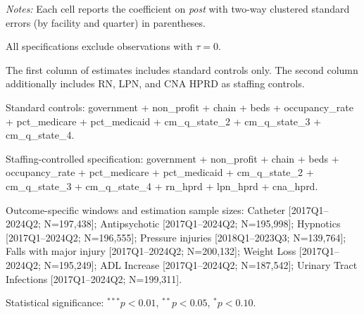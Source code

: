 \documentclass[11pt]{article}
\begin{document}
\begin{table}[!ht]
\begin{threeparttable}
\begin{tablenotes}[flushleft]
\footnotesize
\item \textit{Notes:} Each cell reports the coefficient on \textit{post} with two-way clustered standard errors (by facility and quarter) in parentheses.
\item All specifications exclude observations with $\tau = 0$.
\item The first column of estimates includes standard controls only. The second column additionally includes RN, LPN, and CNA HPRD as staffing controls.
\item Standard controls: government + non\_profit + chain + beds + occupancy\_rate + pct\_medicare + pct\_medicaid + cm\_q\_state\_2 + cm\_q\_state\_3 + cm\_q\_state\_4.
\item Staffing-controlled specification: government + non\_profit + chain + beds + occupancy\_rate + pct\_medicare + pct\_medicaid + cm\_q\_state\_2 + cm\_q\_state\_3 + cm\_q\_state\_4 + rn\_hprd + lpn\_hprd + cna\_hprd.
\item Outcome-specific windows and estimation sample sizes: Catheter [2017Q1--2024Q2; N=197,438]; Antipsychotic [2017Q1--2024Q2; N=195,998]; Hypnotics [2017Q1--2024Q2; N=196,555]; Pressure injuries [2018Q1--2023Q3; N=139,764]; Falls with major injury [2017Q1--2024Q2; N=200,132]; Weight Loss [2017Q1--2024Q2; N=195,249]; ADL Increase [2017Q1--2024Q2; N=187,542]; Urinary Tract Infections [2017Q1--2024Q2; N=199,311].
\item Statistical significance: $^{***}p<0.01$, $^{**}p<0.05$, $^{*}p<0.10$.
\end{tablenotes}
\end{threeparttable}
\end{table}
\end{document}
